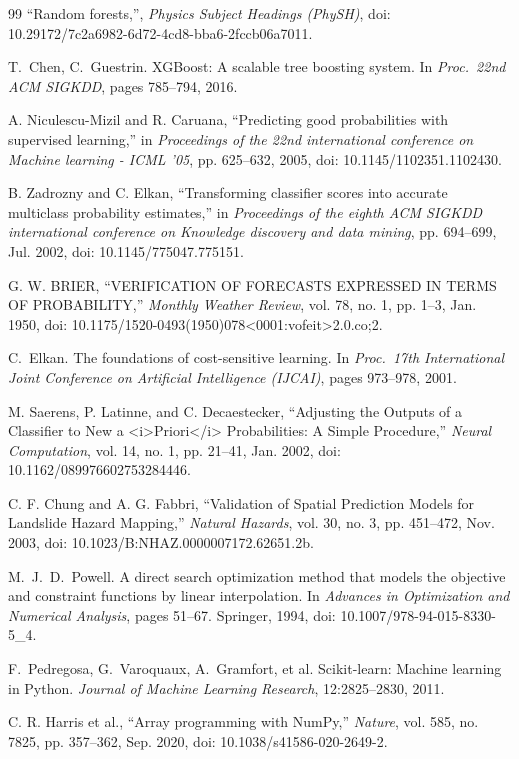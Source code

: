 \documentclass[10pt,twocolumn]{article}
\begin{document}
{\begin{thebibliography}{99}
``Random forests,'', \emph{Physics Subject Headings (PhySH)}, doi: 10.29172/7c2a6982-6d72-4cd8-bba6-2fccb06a7011.

T.~Chen, C.~Guestrin. XGBoost: A scalable tree boosting system. In \emph{Proc.\ 22nd ACM SIGKDD}, pages 785--794, 2016.

A. Niculescu-Mizil and R. Caruana, ``Predicting good probabilities with supervised learning,'' in \emph{Proceedings of the 22nd international conference on Machine learning - ICML '05}, pp. 625--632, 2005, doi: 10.1145/1102351.1102430.

B. Zadrozny and C. Elkan, ``Transforming classifier scores into accurate multiclass probability estimates,'' in \emph{Proceedings of the eighth ACM SIGKDD international conference on Knowledge discovery and data mining}, pp. 694--699, Jul. 2002, doi: 10.1145/775047.775151.

G. W. BRIER, ``VERIFICATION OF FORECASTS EXPRESSED IN TERMS OF PROBABILITY,'' \emph{Monthly Weather Review}, vol. 78, no. 1, pp. 1--3, Jan. 1950, doi: 10.1175/1520-0493(1950)078<0001:vofeit>2.0.co;2.

C.~Elkan. The foundations of cost-sensitive learning. In \emph{Proc.\ 17th International Joint Conference on Artificial Intelligence (IJCAI)}, pages 973--978, 2001.

M. Saerens, P. Latinne, and C. Decaestecker, ``Adjusting the Outputs of a Classifier to New a <i>Priori</i> Probabilities: A Simple Procedure,'' \emph{Neural Computation}, vol. 14, no. 1, pp. 21--41, Jan. 2002, doi: 10.1162/089976602753284446.

C. F. Chung and A. G. Fabbri, ``Validation of Spatial Prediction Models for Landslide Hazard Mapping,'' \emph{Natural Hazards}, vol. 30, no. 3, pp. 451--472, Nov. 2003, doi: 10.1023/B:NHAZ.0000007172.62651.2b.

M.~J.~D.~Powell. A direct search optimization method that models the objective and constraint functions by linear interpolation. In \emph{Advances in Optimization and Numerical Analysis}, pages 51--67. Springer, 1994, doi: 10.1007/978-94-015-8330-5\_4.

F.~Pedregosa, G.~Varoquaux, A.~Gramfort, et al. Scikit-learn: Machine learning in Python. \emph{Journal of Machine Learning Research}, 12:2825--2830, 2011.

C. R. Harris et al., ``Array programming with NumPy,'' \emph{Nature}, vol. 585, no. 7825, pp. 357--362, Sep. 2020, doi: 10.1038/s41586-020-2649-2.


\end{thebibliography}}
\end{document}
